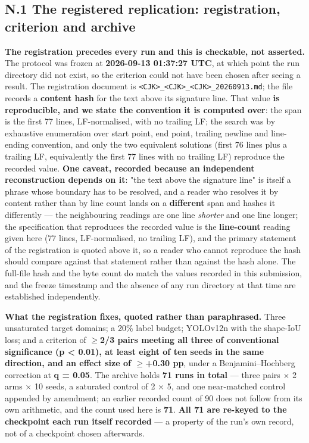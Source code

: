 \documentclass[pdflatex,sn-mathphys-ay]{sn-jnl}
\begin{document}
\subsection*{N.1 The registered replication: registration, criterion and archive}

\textbf{The registration precedes every run and this is checkable, not asserted.} The protocol was frozen at \textbf{2026-09-13 01:37:27 UTC}, at which point the run directory did not exist, so the criterion could not have been chosen after seeing a result. The registration document is \texttt{<CJK>\_<CJK>\_<CJK>\_20260913.md}; the file records a \textbf{content hash} for the text above its signature line. That value \textbf{is reproducible, and we state the convention it is computed over}: the span is the first 77 lines, LF-normalised, with no trailing LF; the search was by exhaustive enumeration over start point, end point, trailing newline and line-ending convention, and only the two equivalent solutions (first 76 lines plus a trailing LF, equivalently the first 77 lines with no trailing LF) reproduce the recorded value. \textbf{One caveat, recorded because an independent reconstruction depends on it}: "the text above the signature line" is itself a phrase whose boundary has to be resolved, and a reader who resolves it by content rather than by line count lands on a \textbf{different} span and hashes it differently --- the neighbouring readings are one line \emph{shorter} and one line longer; the specification that reproduces the recorded value is the \textbf{line-count} reading given here (77 lines, LF-normalised, no trailing LF), and the primary statement of the registration is quoted above it, so a reader who cannot reproduce the hash should compare against that statement rather than against the hash alone. The full-file hash and the byte count do match the values recorded in this submission, and the freeze timestamp and the absence of any run directory at that time are established independently.

\textbf{What the registration fixes, quoted rather than paraphrased.} Three unsaturated target domains; a 20\% label budget; YOLOv12n with the shape-IoU loss; and a criterion of \textbf{\ensuremath{\geq}2/3 pairs meeting all three of conventional significance (p \textless{} 0.01), at least eight of ten seeds in the same direction, and an effect size of \ensuremath{\geq}+0.30 pp}, under a Benjamini--Hochberg correction at \textbf{q = 0.05}. The archive holds \textbf{71 runs in total} --- three pairs \ensuremath{\times} 2 arms \ensuremath{\times} 10 seeds, a saturated control of 2 \ensuremath{\times} 5, and one near-matched control appended by amendment; an earlier recorded count of 90 does not follow from its own arithmetic, and the count used here is \textbf{71}. \textbf{All 71 are re-keyed to the checkpoint each run itself recorded} --- a property of the run's own record, not of a checkpoint chosen afterwards.
\end{document}
